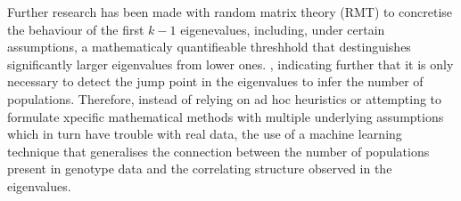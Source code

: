 \documentclass[a4paper, 11pt]{article}
\begin{document}
Further research has been made with random matrix theory (RMT) to concretise the behaviour of the first $k-1$ eigenevalues, including, under certain assumptions, a mathematicaly quantifieable threshhold that destinguishes significantly larger eigenvalues from lower ones. \cite{bryc2013separation}, indicating further that it is only necessary to detect the jump point in the eigenvalues to infer the number of populations. Therefore, instead of relying on ad hoc heuristics or attempting to formulate xpecific mathematical methods with multiple underlying assumptions which in turn have trouble with real data, the use of a machine learning technique that generalises the connection between the number of populations present in genotype data and the correlating structure observed in the eigenvalues.\\
\end{document}
